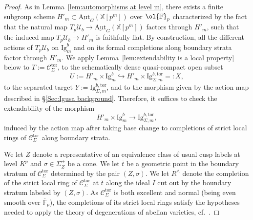 \documentclass[letterpaper,11pt]{amsart}
\begin{document}
\begin{proof}
As in Lemma~\ref{lem:automorphisms at level 
m}, there exists a finite subgroup scheme $H'_m \subset \underline{\mathrm{Aut}}_G(\mathbb{X}[p^m])$ 
over $\ol{\mathbb{F}}_p$ characterized by the fact that the natural map $T_p\mathcal{U}_b \to \underline{\mathrm{Aut}}_G(\mathbb{X}[p^m])$ factors through $H'_m$, such that the induced map $T_p\mathcal{U}_b\to H'_m$ is faithfully flat. By construction, all the different actions of $T_p\mathcal{U}_b$ on $\mathrm{Ig}^b_m$ and on its formal completions along boundary strata factor through $H'_m$. We apply Lemma~\ref{lem:extendability is a local property} below to $T:=\mathscr{C}^{\mathrm{tor}}_{\Sigma}$, to the schematically dense quasi-compact open subset  
\[
U:=H'_m\times \mathrm{Ig}^b_m\hookrightarrow H'_m\times \mathrm{Ig}^{b,\mathrm{tor}}_{\Sigma, m}=:X,
\]
to the separated target $Y:=\mathrm{Ig}^{b,\mathrm{tor}}_{\Sigma, m}$, and to the morphism given by the action map described in \S\ref{Sec:Igusa background}. Therefore, it suffices to check the extendability of the morphism 
\begin{equation}\label{eq:action on open Igusa}
H'_m\times \mathrm{Ig}^b_m\to \mathrm{Ig}^{b,\mathrm{tor}}_{\Sigma, m},
\end{equation}
induced by the action map after taking base change to completions of strict local rings of $\mathscr{C}^{\mathrm{tor}}_{\Sigma}$ along boundary strata. 

We let $Z$ denote a representative of an equivalence class of usual cusp labels at level $K^p$ and $\sigma \in \Sigma_{Z}^+$ be a cone. We let $\bar{t}$ be a geometric point in the boundary stratum of $\mathscr{C}^{\mathrm{tor}}_{\Sigma}$ determined by the pair $(Z,\sigma)$. We let $R^{\wedge}$ denote the completion of the strict local ring of $\mathscr{C}^{\mathrm{tor}}_{\Sigma}$ at $\bar{t}$ along the ideal $I$ cut out by the boundary stratum labeled by $(Z,\sigma)$. 
As $\mathscr{C}^{\mathrm{tor}}_{\Sigma}$ is both excellent and normal (being even smooth over $\overline{\mathbb{F}}_p$), the completions of its strict local rings satisfy the hypotheses needed to apply the theory of degenerations of abelian varieties, cf.~\cite[\S 4.1]{lan-thesis}. 


\end{proof}
\end{document}
